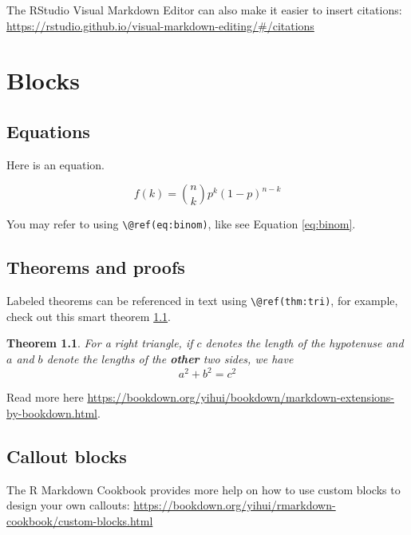 \documentclass[
]{book}
\newtheorem{theorem}{Theorem}[chapter]
\theoremstyle{definition}
\theoremstyle{definition}
\theoremstyle{definition}
\theoremstyle{definition}
\theoremstyle{remark}
\begin{document}
The RStudio Visual Markdown Editor can also make it easier to insert citations: \url{https://rstudio.github.io/visual-markdown-editing/\#/citations}

\hypertarget{blocks}{%
\chapter{Blocks}\label{blocks}}

\hypertarget{equations}{%
\section{Equations}\label{equations}}

Here is an equation.

\begin{equation} 
  f\left(k\right) = \binom{n}{k} p^k\left(1-p\right)^{n-k}
  \label{eq:binom}
\end{equation}

You may refer to using \texttt{\textbackslash{}@ref(eq:binom)}, like see Equation \eqref{eq:binom}.

\hypertarget{theorems-and-proofs}{%
\section{Theorems and proofs}\label{theorems-and-proofs}}

Labeled theorems can be referenced in text using \texttt{\textbackslash{}@ref(thm:tri)}, for example, check out this smart theorem \ref{thm:tri}.

\begin{theorem}
\protect\hypertarget{thm:tri}{}\label{thm:tri}For a right triangle, if \(c\) denotes the \emph{length} of the hypotenuse
and \(a\) and \(b\) denote the lengths of the \textbf{other} two sides, we have
\[a^2 + b^2 = c^2\]
\end{theorem}

Read more here \url{https://bookdown.org/yihui/bookdown/markdown-extensions-by-bookdown.html}.

\hypertarget{callout-blocks}{%
\section{Callout blocks}\label{callout-blocks}}

The R Markdown Cookbook provides more help on how to use custom blocks to design your own callouts: \url{https://bookdown.org/yihui/rmarkdown-cookbook/custom-blocks.html}
\end{document}
